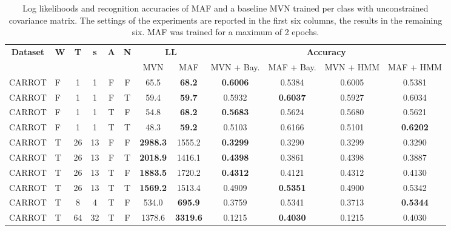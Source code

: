 \documentclass[11pt,titlepage,oneside,openany]{book}
\begin{document}
\begin{table}[H]
	\centering
	\tiny
	\begin{tabular}{c l c c c c c c c c c c}
		\toprule
		\multirow{2}{*}{\bfseries Dataset} & 
		\multirow{2}{*}{\bfseries W} & 
		\multirow{2}{*}{\bfseries T} &
		\multirow{2}{*}{\bfseries s} &
		\multirow{2}{*}{\bfseries A} &
		\multirow{2}{*}{\bfseries N} &
		\multicolumn{2}{c}{\bfseries LL} & 
		\multicolumn{4}{c}{\bfseries Accuracy}\\
		\cmidrule(lr){7-8}
		\cmidrule(lr){9-12}
		& & & & & & MVN & MAF & MVN + Bay. & MAF + Bay. & MVN + HMM & MAF + HMM \\
		\cmidrule(lr){1-12}
		CARROT &   F &       1 &       1 &    F &  F &   65.5 &   \textbf{68.2} &   \textbf{0.6006} &   0.5384 &   0.6005 &   0.5381 \\
		CARROT &   F &       1 &       1 &    F &  T &   59.4 &   \textbf{59.7} &   0.5932 &   \textbf{0.6037} &   0.5927 &   0.6034 \\
		CARROT &   F &       1 &       1 &    T &  F &   54.8 &   \textbf{68.2} &   \textbf{0.5683} &   0.5624 &   0.5680 &   0.5621 \\
		CARROT &   F &       1 &       1 &    T &  T &   48.3 &   \textbf{59.2} &   0.5103 &   0.6166 &   0.5101 &   \textbf{0.6202} \\
		CARROT &   T &      26 &      13 &    F &  F & \textbf{2988.3} & 1555.2 &   \textbf{0.3299} &   0.3290 &   0.3299 &   0.3290 \\
		CARROT &   T &      26 &      13 &    F &  T & \textbf{2018.9} & 1416.1 &   \textbf{0.4398} &   0.3861 &   0.4398 &   0.3887 \\
		CARROT &   T &      26 &      13 &    T &  F & \textbf{1883.5} & 1720.2 &   \textbf{0.4312} &   0.4121 &   0.4312 &   0.4130 \\
		CARROT &   T &      26 &      13 &    T &  T & \textbf{1569.2} & 1513.4 &   0.4909 &   \textbf{0.5351} &   0.4900 &   0.5342 \\
		CARROT &   T &       8 &       4 &    T &  F &  534.0 &  \textbf{695.9} &   0.3759 &   0.5341 &   0.3713 &   \textbf{0.5344} \\
		CARROT &   T &      64 &      32 &    T &  F & 1378.6 & \textbf{3319.6} &   0.1215 &   \textbf{0.4030} &   0.1215 &   0.4030 \\
		\bottomrule
	\end{tabular}
	\caption[Evaluation Results Carrot, Short]{\label{tab:2eps} Log likelihoods and recognition accuracies of MAF and a baseline MVN trained per class with unconstrained covariance matrix. The settings of the experiments are reported in the first six columns, the results in the remaining six. MAF was trained for a maximum of 2 epochs.}
\end{table}
\end{document}
